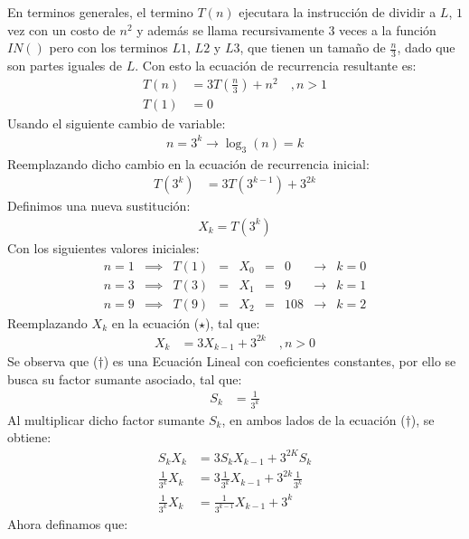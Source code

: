 \begin{solution}
En terminos generales, el termino $T(n)$ ejecutara la instrucción de dividir a $L$, $1$ vez con un costo de $n^2$ y además se llama recursivamente $3$ veces a la función $IN()$ pero con los terminos $L1$, $L2$ y $L3$, que tienen un tamaño de $\frac{n}{3}$, dado que son partes iguales de $L$. Con esto la ecuación de recurrencia resultante es:
\begin{align*}
    T(n) &= 3T\left(\frac{n}{3}\right) + n^2 \quad, n >1\\
    T(1) &= 0
\end{align*}
Usando el siguiente cambio de variable:
\begin{align*}
    n=3^k \xrightarrow{} \log_3(n)=k
\end{align*}
Reemplazando dicho cambio en la ecuación de recurrencia inicial:
\begin{align*}
    T(3^k) &= 3T\left(3^{k-1}\right) + 3^{2k} \tag{$\star$}
\end{align*}
Definimos una nueva sustitución:
\begin{align*}
      X_k = T\left(3^k\right)
\end{align*}
Con los siguientes valores iniciales:
  $$
  \left.
    \begin{array}{rcrrrrlcr}
      n=1 &\implies& T(1)&=&X_0&=&0 &\rightarrow& k=0\\
      n=3 &\implies& T(3)&=&X_1&=&9 &\rightarrow& k=1\\
      n=9 &\implies& T(9)&=&X_2&=&108 &\rightarrow& k=2
    \end{array}
  \right.
  $$
Reemplazando $X_k$ en la ecuación ($\star$), tal que:
\begin{align*}
    X_k &= 3 X_{k-1} +3^{2k} \quad, n>0 \tag{$\dagger$}
\end{align*}
Se observa que ($\dagger$) es una Ecuación Lineal con coeficientes constantes, por ello se busca su factor sumante asociado, tal que:
\begin{align*}
    S_k &= \frac{1}{3^k}
\end{align*}
Al multiplicar dicho factor sumante $S_k$, en ambos lados de la ecuación ($\dagger$), se obtiene:
\begin{align*}
    S_k X_k &= 3 S_k X_{k-1} + 3^{2K} S_k \\
    \frac{1}{3^k}X_k &= 3 \frac{1}{3^k} X_{k-1} + 3^{2k} \frac{1}{3^k}\\
    \frac{1}{3^k} X_k &= \frac{1}{3^{k-1}}X_{k-1} + 3^k \tag{$\dagger'$}
\end{align*}
Ahora definamos que:
\begin{align*}

\end{align*}
\end{solution}
